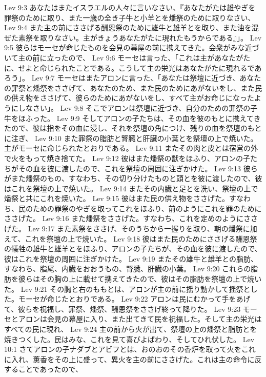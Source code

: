 Lev 9:3  あなたはまたイスラエルの人々に言いなさい、『あなたがたは雄やぎを罪祭のために取り、また一歳の全き子牛と小羊とを燔祭のために取りなさい、
Lev 9:4  また主の前にささげる酬恩祭のために雄牛と雄羊とを取り、また油を混ぜた素祭を取りなさい。主がきょうあなたがたに現れたもうからである』」。
Lev 9:5  彼らはモーセが命じたものを会見の幕屋の前に携えてきた。会衆がみな近づいて主の前に立ったので、
Lev 9:6  モーセは言った、「これは主があなたがたに、せよと命じられたことである。こうして主の栄光はあなたがたに現れるであろう」。
Lev 9:7  モーセはまたアロンに言った、「あなたは祭壇に近づき、あなたの罪祭と燔祭をささげて、あなたのため、また民のためにあがないをし、また民の供え物をささげて、彼らのためにあがないをし、すべて主がお命じになったようにしなさい」。
Lev 9:8  そこでアロンは祭壇に近づき、自分のための罪祭の子牛をほふった。
Lev 9:9  そしてアロンの子たちは、その血を彼のもとに携えてきたので、彼は指をその血に浸し、それを祭壇の角につけ、残りの血を祭壇のもとに注ぎ、
Lev 9:10  また罪祭の脂肪と腎臓と肝臓の小葉とを祭壇の上で焼いた。主がモーセに命じられたとおりである。
Lev 9:11  またその肉と皮とは宿営の外で火をもって焼き捨てた。
Lev 9:12  彼はまた燔祭の獣をほふり、アロンの子たちがその血を彼に渡したので、これを祭壇の周囲に注ぎかけた。
Lev 9:13  彼らがまた燔祭のもの、すなわち、その切り分けたものと頭とを彼に渡したので、彼はこれを祭壇の上で焼いた。
Lev 9:14  またその内臓と足とを洗い、祭壇の上で燔祭と共にこれを焼いた。
Lev 9:15  彼はまた民の供え物をささげた。すなわち、民のための罪祭のやぎを取ってこれをほふり、前のようにこれを罪のためにささげた。
Lev 9:16  また燔祭をささげた。すなわち、これを定めのようにささげた。
Lev 9:17  また素祭をささげ、そのうちから一握りを取り、朝の燔祭に加えて、これを祭壇の上で焼いた。
Lev 9:18  彼はまた民のためにささげる酬恩祭の犠牲の雄牛と雄羊とをほふり、アロンの子たちが、その血を彼に渡したので、彼はこれを祭壇の周囲に注ぎかけた。
Lev 9:19  またその雄牛と雄羊との脂肪、すなわち、脂尾、内臓をおおうもの、腎臓、肝臓の小葉。
Lev 9:20  これらの脂肪を彼らはその胸の上に載せて携えてきたので、彼はその脂肪を祭壇の上で焼いた。
Lev 9:21  その胸と右のももとは、アロンが主の前に揺り動かして揺祭とした。モーセが命じたとおりである。
Lev 9:22  アロンは民にむかって手をあげて、彼らを祝福し、罪祭、燔祭、酬恩祭をささげ終って降りた。
Lev 9:23  モーセとアロンは会見の幕屋に入り、また出てきて民を祝福した。そして主の栄光はすべての民に現れ、
Lev 9:24  主の前から火が出て、祭壇の上の燔祭と脂肪とを焼きつくした。民はみな、これを見て喜びよばわり、そしてひれ伏した。
Lev 10:1  さてアロンの子ナダブとアビフとは、おのおのその香炉を取って火をこれに入れ、薫香をその上に盛って、異火を主の前にささげた。これは主の命令に反することであったので、
